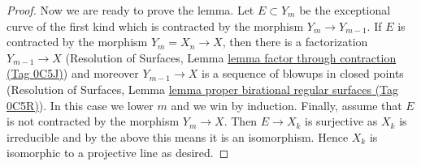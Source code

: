 \documentclass{amsart}
\theoremstyle{plain}
\theoremstyle{definition}
\theoremstyle{remark}
\numberwithin{equation}{subsection}
\begin{document}
\begin{proof}
\medskip\noindent
Now we are ready to prove the lemma.
Let $E \subset Y_m$ be the exceptional curve of the first kind
which is contracted by the morphism $Y_m \to Y_{m - 1}$. If $E$ is
contracted by the morphism $Y_m = X_n \to X$, then there is a factorization
$Y_{m - 1} \to X$ (Resolution of Surfaces, Lemma
\href{https://stacks.math.columbia.edu/tag/0C5J}{lemma factor through contraction (Tag 0C5J)})
and moreover $Y_{m - 1} \to X$ is a sequence of blowups
in closed points (Resolution of Surfaces, Lemma
\href{https://stacks.math.columbia.edu/tag/0C5R}{lemma proper birational regular surfaces (Tag 0C5R)}).
In this case we lower $m$ and we win by induction.
Finally, assume that $E$ is not contracted by the morphism $Y_m \to X$.
Then $E \to X_k$ is surjective as $X_k$ is irreducible
and by the above this means it is an isomorphism.
Hence $X_k$ is isomorphic to a projective line as desired.
\end{proof}
\end{document}
